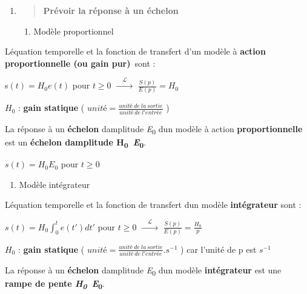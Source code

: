\begin{enumerate}
\def\labelenumi{\arabic{enumi}.}
\item
  \begin{quote}
  \protect\hypertarget{_Toc99121097}{}{}\textbf{Prévoir la réponse à un échelon}
  \end{quote}

  \begin{enumerate}
  \def\labelenumii{\arabic{enumii}.}
  \item
    \protect\hypertarget{_Toc99121098}{}{}Modèle proportionnel
  \end{enumerate}
\end{enumerate}

L\textquotesingle équation temporelle et la fonction de transfert d'un modèle à \textbf{action proportionnelle (ou gain pur)}~sont :

s\((t) = H_{0}e(t)\) pour \(t \geq 0\) \(\overset{\quad\mathcal{L}\quad}{\rightarrow}\) \(\frac{S(p)}{E(p)} = H_{0}\)

\(H_{0}\) : \textbf{gain statique} ( \(unité = \frac{unité\ de\ la\ sortie}{unité\ de\ l'entrée}\) )

La réponse à un \textbf{échelon} d\textquotesingle amplitude \emph{E}\textsubscript{0} d\textquotesingle un modèle à action \textbf{proportionnelle} est un \textbf{échelon d\textquotesingle amplitude H\textsubscript{0}\emph{~E}\textsubscript{0}}.

\(s(t) = H_{0}E_{0}\) pour \(t \geq 0\)

\begin{enumerate}
\def\labelenumi{\arabic{enumi}.}
\setcounter{enumi}{1}
\item
  \protect\hypertarget{_Toc272938046}{}{}Modèle intégrateur
\end{enumerate}

L\textquotesingle équation temporelle et la fonction de transfert d\textquotesingle un modèle \textbf{intégrateur} sont :

\(s(t) = H_{0}\int_{0}^{t}{e(t')}dt'\) pour \(t \geq 0\) \(\overset{\quad\mathcal{L}\quad}{\rightarrow}\) \(\frac{S(p)}{E(p)} = \frac{H_{0}}{p}\)

\(H_{0}\) : \textbf{gain statique} ( \(unité = \frac{unité\ de\ la\ sortie}{unité\ de\ l'entrée}.s^{- 1}\) ) car l'unité de p est \(s^{- 1}\)

La réponse à un \textbf{échelon} d\textquotesingle amplitude \emph{E}\textsubscript{0} d\textquotesingle un modèle \textbf{intégrateur} est une \textbf{rampe de pente \emph{H\textsubscript{0}~E}\textsubscript{0}}.


